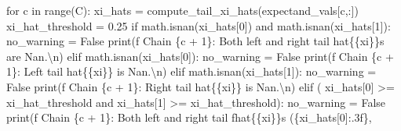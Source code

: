 \documentclass[
  letterpaper,
  DIV=11,
  numbers=noendperiod]{scrartcl}
\newenvironment{Shaded}{\begin{snugshade}}{\end{snugshade}}
\newcommand{\BuiltInTok}[1]{\textcolor[rgb]{0.00,0.23,0.31}{#1}}
\newcommand{\CharTok}[1]{\textcolor[rgb]{0.13,0.47,0.30}{#1}}
\newcommand{\ControlFlowTok}[1]{\textcolor[rgb]{0.00,0.23,0.31}{#1}}
\newcommand{\DecValTok}[1]{\textcolor[rgb]{0.68,0.00,0.00}{#1}}
\newcommand{\FloatTok}[1]{\textcolor[rgb]{0.68,0.00,0.00}{#1}}
\newcommand{\KeywordTok}[1]{\textcolor[rgb]{0.00,0.23,0.31}{#1}}
\newcommand{\NormalTok}[1]{\textcolor[rgb]{0.00,0.23,0.31}{#1}}
\newcommand{\OperatorTok}[1]{\textcolor[rgb]{0.37,0.37,0.37}{#1}}
\newcommand{\SpecialCharTok}[1]{\textcolor[rgb]{0.37,0.37,0.37}{#1}}
\newcommand{\SpecialStringTok}[1]{\textcolor[rgb]{0.13,0.47,0.30}{#1}}
\newcommand{\StringTok}[1]{\textcolor[rgb]{0.13,0.47,0.30}{#1}}
\newcommand{\VariableTok}[1]{\textcolor[rgb]{0.07,0.07,0.07}{#1}}
\begin{document}
\begin{Shaded}
\begin{Highlighting}[]
  \ControlFlowTok{for}\NormalTok{ c }\KeywordTok{in} \BuiltInTok{range}\NormalTok{(C):}
\NormalTok{    xi\_hats }\OperatorTok{=}\NormalTok{ compute\_tail\_xi\_hats(expectand\_vals[c,:])}
\NormalTok{    xi\_hat\_threshold }\OperatorTok{=} \FloatTok{0.25}
    \ControlFlowTok{if}\NormalTok{ math.isnan(xi\_hats[}\DecValTok{0}\NormalTok{]) }\KeywordTok{and}\NormalTok{ math.isnan(xi\_hats[}\DecValTok{1}\NormalTok{]):}
\NormalTok{      no\_warning }\OperatorTok{=} \VariableTok{False}
      \BuiltInTok{print}\NormalTok{(}\SpecialStringTok{f\textquotesingle{}  Chain }\SpecialCharTok{\{}\NormalTok{c }\OperatorTok{+} \DecValTok{1}\SpecialCharTok{\}}\SpecialStringTok{: Both left and right tail \textquotesingle{}}
            \StringTok{\textquotesingle{}hat}\SpecialCharTok{\{\{}\StringTok{xi}\SpecialCharTok{\}\}}\StringTok{s are Nan.}\CharTok{\textbackslash{}n}\StringTok{\textquotesingle{}}\NormalTok{)}
    \ControlFlowTok{elif}\NormalTok{ math.isnan(xi\_hats[}\DecValTok{0}\NormalTok{]):}
\NormalTok{      no\_warning }\OperatorTok{=} \VariableTok{False}
      \BuiltInTok{print}\NormalTok{(}\SpecialStringTok{f\textquotesingle{}  Chain }\SpecialCharTok{\{}\NormalTok{c }\OperatorTok{+} \DecValTok{1}\SpecialCharTok{\}}\SpecialStringTok{: Left tail \textquotesingle{}}
            \StringTok{\textquotesingle{}hat}\SpecialCharTok{\{\{}\StringTok{xi}\SpecialCharTok{\}\}}\StringTok{ is Nan.}\CharTok{\textbackslash{}n}\StringTok{\textquotesingle{}}\NormalTok{)}
    \ControlFlowTok{elif}\NormalTok{ math.isnan(xi\_hats[}\DecValTok{1}\NormalTok{]):}
\NormalTok{      no\_warning }\OperatorTok{=} \VariableTok{False}
      \BuiltInTok{print}\NormalTok{(}\SpecialStringTok{f\textquotesingle{}  Chain }\SpecialCharTok{\{}\NormalTok{c }\OperatorTok{+} \DecValTok{1}\SpecialCharTok{\}}\SpecialStringTok{: Right tail \textquotesingle{}}
            \StringTok{\textquotesingle{}hat}\SpecialCharTok{\{\{}\StringTok{xi}\SpecialCharTok{\}\}}\StringTok{ is Nan.}\CharTok{\textbackslash{}n}\StringTok{\textquotesingle{}}\NormalTok{)}
    \ControlFlowTok{elif}\NormalTok{ (    xi\_hats[}\DecValTok{0}\NormalTok{] }\OperatorTok{\textgreater{}=}\NormalTok{ xi\_hat\_threshold }
         \KeywordTok{and}\NormalTok{ xi\_hats[}\DecValTok{1}\NormalTok{] }\OperatorTok{\textgreater{}=}\NormalTok{ xi\_hat\_threshold):}
\NormalTok{      no\_warning }\OperatorTok{=} \VariableTok{False}
      \BuiltInTok{print}\NormalTok{(}\SpecialStringTok{f\textquotesingle{}  Chain }\SpecialCharTok{\{}\NormalTok{c }\OperatorTok{+} \DecValTok{1}\SpecialCharTok{\}}\SpecialStringTok{: Both left and right tail \textquotesingle{}}
            \SpecialStringTok{f\textquotesingle{}hat}\CharTok{\{\{}\SpecialStringTok{xi}\CharTok{\}\}}\SpecialStringTok{s (}\SpecialCharTok{\{}\NormalTok{xi\_hats[}\DecValTok{0}\NormalTok{]}\SpecialCharTok{:.3f\}}\SpecialStringTok{, \textquotesingle{}}

\end{Highlighting}
\end{Shaded}
\end{document}
